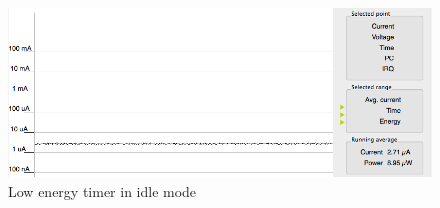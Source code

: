 \begin{figure}[H]
  \centering
  \includegraphics[clip, trim=0cm 0cm 0cm 0cm, width=12cm]{fig/idleEnergy.png}
  \caption{Low energy timer in idle mode}
\end{figure}
